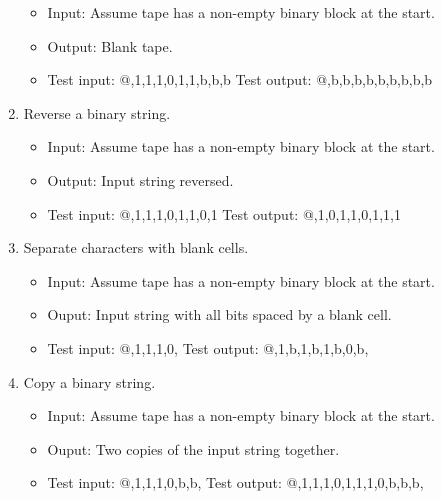 \documentclass[11pt]{report}
\begin{document}
\begin{enumerate}
		\begin{itemize}
			\item[] Input: Assume tape has a non-empty binary block at the start.
			\item[] Output: Blank tape. 
			\item[] Test input: @,1,1,1,0,1,1,b,b,b Test output: @,b,b,b,b,b,b,b,b,b
		\end{itemize}

	\item Reverse a binary string.
		
		\begin{itemize}
			\item[] Input: Assume tape has a non-empty binary block at the start.
			\item[] Output: Input string reversed.
			\item[] Test input: @,1,1,1,0,1,1,0,1 Test output: @,1,0,1,1,0,1,1,1
		\end{itemize}
	
	\item Separate characters with blank cells. 
	
		\begin{itemize}
			\item[] Input: Assume tape has a non-empty binary block at the start.
			\item[] Ouput: Input string with all bits spaced by a blank cell. 
			\item[] Test input: @,1,1,1,0, Test output: @,1,b,1,b,1,b,0,b,
		\end{itemize}
	
	\item Copy a binary string.
		
		\begin{itemize}
			\item[] Input: Assume tape has a non-empty binary block at the start.
			\item[] Ouput: Two copies of the input string together. 
			\item[] Test input: @,1,1,1,0,b,b, Test output: @,1,1,1,0,1,1,1,0,b,b,b,
		\end{itemize} 	
	 
\end{enumerate}
	
\end{document}
